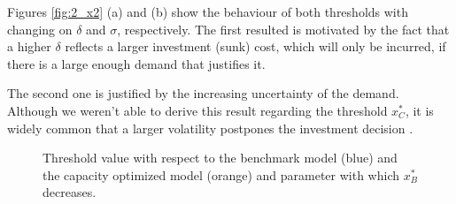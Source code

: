 Figures \ref{fig:2_x2} (a) and (b) show the behaviour of both thresholds with changing on $\delta$ and $\sigma$, respectively. 
The first resulted is motivated by the fact that a higher $\delta$ reflects a larger investment (sunk) cost, which will only be incurred, if there is a large enough demand that justifies it.

The second one is justified by the increasing uncertainty of the demand. Although we weren't able to derive this result regarding the threshold $x_C^*$, it is widely common that a larger volatility postpones the investment decision \cite{dixit:book}. 


\begin{figure}[!htb]
	\begin{subfigmatrix}{2}
	\end{subfigmatrix}
	\caption{Threshold value with respect to the benchmark model (blue) and the capacity optimized model (orange) and parameter with which  $x^*_B$ decreases.}
	\label{fig:2_x3}
\end{figure}

